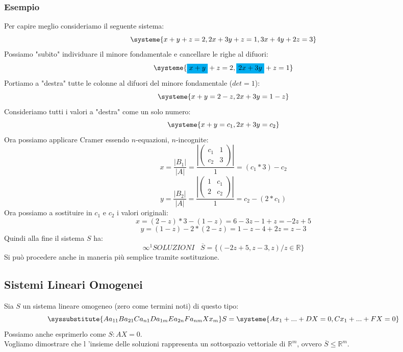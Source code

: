 \subsubsection{Esempio}
Per capire meglio consideriamo il seguente sistema:
$$ 
\systeme
{
x+y+z = 2,
2x+3y+z=1,
3x+4y+2z=3
}
$$
Possiamo "subito" individuare il minore fondamentale e cancellare le righe al difuori:
$$ 
\systeme
{
\mathcolorbox{cyan}{x+y}+z = 2,
\mathcolorbox{cyan}{2x+3y}+z=1
}
$$
Portiamo a "destra" tutte le colonne al difuori del minore fondamentale ($det = 1$):
$$ 
\systeme
{
x+y = 2-z,
2x+3y=1-z
}
$$
Consideriamo tutti i valori a "destra" come un solo numero:
$$ 
\systeme
{
x+y = c_1,
2x+3y=c_2
}
$$
Ora possiamo applicare Cramer essendo $n$-equazioni, $n$-incognite:
$$ 
x = \frac{|B_1|}{|A|} = \frac{|\begin{pmatrix}c_1 & 1 \\ c_2 & 3\end{pmatrix}|}{1} = (c_1*3)-c_2
$$
$$
y = \frac{|B_2|}{|A|} = \frac{|\begin{pmatrix}1 & c_1  \\ 2 & c_2\end{pmatrix}|}{1} = c_2-(2*c_1)
$$
Ora possiamo a sostituire in $c_1$ e $c_2$ i valori originali:
$$ x = (2-z)*3 -(1-z) = 6-3z-1+z = -2z +5  $$
$$ y = (1-z)-2*(2-z) = 1-z-4+2z = z-3$$
Quindi alla fine il sistema $S$ ha:
$$ \infty^1 SOLUZIONI \;\;\; \overline{S} = \{(-2z+5,z-3,z)/ z \in \mathbb{R}\}$$
Si può procedere anche in maneria più semplice tramite sostituzione.

\subsection{Sistemi Lineari Omogenei}
Sia $S$ un sistema lineare omogeneo (zero come termini noti) di questo tipo:
$$
\syssubstitute{A{a_{11}}B{a_{21}}C{a_{n1}}D{a_{1m}}E{a_{2n}}F{a_{nm}}X{x_{m}}}
S=
\systeme{
  A x_1 +...+ D X  = 0,
  C x_1 +...+ F X = 0
}
$$
Possiamo anche esprimerlo come $S: AX=0$.\\
Vogliamo dimostrare che l ’insieme delle soluzioni rappresenta un sottospazio vettoriale di $\mathbb{R}^m$, ovvero $\overline{S} \le \mathbb{R}^m$.\\

